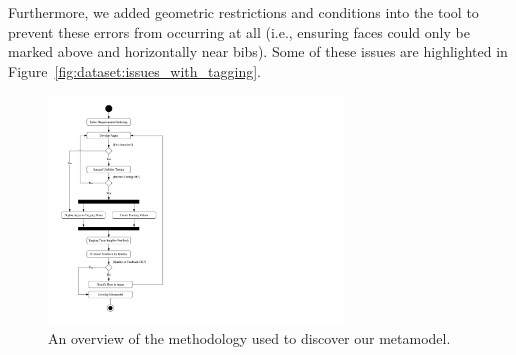 \noindent
Furthermore, we added geometric restrictions and conditions into the tool to prevent these errors from occurring at all (i.e., ensuring faces could only be marked above and horizontally near bibs). Some of these issues are highlighted in Figure~\ref{fig:dataset:issues_with_tagging}.

\begin{figure}[p]
  \centering
  \includegraphics[width=0.7\textwidth]{images/dataset/methodology}
  \caption[Implementation methodology]{An overview of the methodology used to discover our metamodel.}
  \label{fig:dataset:methodology}
\end{figure}

